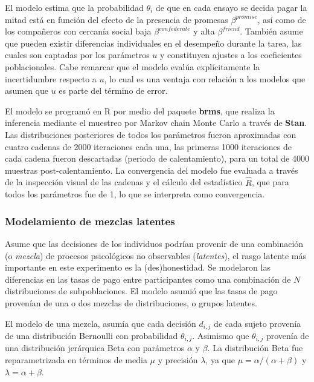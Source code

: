 \documentclass[]{article}
\begin{document}
El modelo estima que la probabilidad \(\theta_i\) de que en cada ensayo
se decida pagar la mitad está en función del efecto de la presencia de
promesas \(\beta^{promise}\), así como de los compañeros con cercanía
social baja \(\beta^{confederate}\) y alta \(\beta^{friend}\). También
asume que pueden existir diferencias individuales en el desempeño
durante la tarea, las cuales son captadas por los parámetros \(u\) y
constituyen ajustes a los coeficientes poblacionales. Cabe remarcar que
el modelo evalúa explícitamente la incertidumbre respecto a \(u\), lo
cual es una ventaja con relación a los modelos que asumen que \(u\) es
parte del término de error.

El modelo se programó en R por medio del paquete \textbf{brms}, que
realiza la inferencia mediante el muestreo por Markov chain Monte Carlo
a través de \textbf{Stan}. Las distribuciones posteriores de todos los
parámetros fueron aproximadas con cuatro cadenas de 2000 iteraciones
cada una, las primeras 1000 iteraciones de cada cadena fueron
descartadas (periodo de calentamiento), para un total de 4000 muestras
post-calentamiento. La convergencia del modelo fue evaluada a través de
la inspección visual de las cadenas y el cálculo del estadístico
\(\hat{R}\), que para todos los parámetros fue de 1, lo que se
interpreta como convergencia.

\subsubsection{Modelamiento de mezclas
latentes}\label{modelamiento-de-mezclas-latentes}

Asume que las decisiones de los individuos podrían provenir de una
combinación (o \emph{mezcla}) de procesos psicológicos no observables
(\emph{latentes}), el rasgo latente más importante en este experimento
es la (des)honestidad. Se modelaron las diferencias en las tasas de pago
entre participantes como una combinación de \(N\) distribuciones de
subpoblaciones. El modelo asumió que las tasas de pago provenían de una
o dos mezclas de distribuciones, o grupos latentes.

El modelo de una mezcla, asumía que cada decisión \(d_{i,j}\) de cada
sujeto provenía de una distribución Bernoulli con probabilidad
\(\theta_{i,j}\). Asimismo que \(\theta_{i,j}\) provenía de una
distribución jerárquica Beta con parámetros \(\alpha\) y \(\beta\). La
distribución Beta fue reparametrizada en términos de media \(\mu\) y
precisión \(\lambda\), ya que \(\mu = \alpha/(\alpha + \beta)\) y
\(\lambda = \alpha + \beta\).
\end{document}
